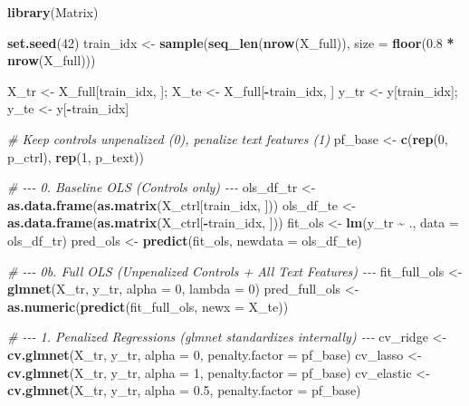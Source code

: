 \documentclass[
]{article}
\newenvironment{Shaded}{\begin{snugshade}}{\end{snugshade}}
\newcommand{\AttributeTok}[1]{\textcolor[rgb]{0.13,0.29,0.53}{#1}}
\newcommand{\CommentTok}[1]{\textcolor[rgb]{0.56,0.35,0.01}{\textit{#1}}}
\newcommand{\DecValTok}[1]{\textcolor[rgb]{0.00,0.00,0.81}{#1}}
\newcommand{\FloatTok}[1]{\textcolor[rgb]{0.00,0.00,0.81}{#1}}
\newcommand{\FunctionTok}[1]{\textcolor[rgb]{0.13,0.29,0.53}{\textbf{#1}}}
\newcommand{\NormalTok}[1]{#1}
\newcommand{\OtherTok}[1]{\textcolor[rgb]{0.56,0.35,0.01}{#1}}
\newcommand{\SpecialCharTok}[1]{\textcolor[rgb]{0.81,0.36,0.00}{\textbf{#1}}}
\begin{document}
\begin{Shaded}
\begin{Highlighting}[]
\FunctionTok{library}\NormalTok{(Matrix)}

\FunctionTok{set.seed}\NormalTok{(}\DecValTok{42}\NormalTok{)}
\NormalTok{train\_idx }\OtherTok{\textless{}{-}} \FunctionTok{sample}\NormalTok{(}\FunctionTok{seq\_len}\NormalTok{(}\FunctionTok{nrow}\NormalTok{(X\_full)), }\AttributeTok{size =} \FunctionTok{floor}\NormalTok{(}\FloatTok{0.8} \SpecialCharTok{*} \FunctionTok{nrow}\NormalTok{(X\_full)))}

\NormalTok{X\_tr }\OtherTok{\textless{}{-}}\NormalTok{ X\_full[train\_idx, ];  X\_te }\OtherTok{\textless{}{-}}\NormalTok{ X\_full[}\SpecialCharTok{{-}}\NormalTok{train\_idx, ]}
\NormalTok{y\_tr }\OtherTok{\textless{}{-}}\NormalTok{ y[train\_idx];         y\_te }\OtherTok{\textless{}{-}}\NormalTok{ y[}\SpecialCharTok{{-}}\NormalTok{train\_idx]}

\CommentTok{\# Keep controls unpenalized (0), penalize text features (1)}
\NormalTok{pf\_base }\OtherTok{\textless{}{-}} \FunctionTok{c}\NormalTok{(}\FunctionTok{rep}\NormalTok{(}\DecValTok{0}\NormalTok{, p\_ctrl), }\FunctionTok{rep}\NormalTok{(}\DecValTok{1}\NormalTok{, p\_text))}

\CommentTok{\# {-}{-}{-} 0. Baseline OLS (Controls only) {-}{-}{-}}
\NormalTok{ols\_df\_tr }\OtherTok{\textless{}{-}} \FunctionTok{as.data.frame}\NormalTok{(}\FunctionTok{as.matrix}\NormalTok{(X\_ctrl[train\_idx, ]))}
\NormalTok{ols\_df\_te }\OtherTok{\textless{}{-}} \FunctionTok{as.data.frame}\NormalTok{(}\FunctionTok{as.matrix}\NormalTok{(X\_ctrl[}\SpecialCharTok{{-}}\NormalTok{train\_idx, ]))}
\NormalTok{fit\_ols   }\OtherTok{\textless{}{-}} \FunctionTok{lm}\NormalTok{(y\_tr }\SpecialCharTok{\textasciitilde{}}\NormalTok{ ., }\AttributeTok{data =}\NormalTok{ ols\_df\_tr)}
\NormalTok{pred\_ols  }\OtherTok{\textless{}{-}} \FunctionTok{predict}\NormalTok{(fit\_ols, }\AttributeTok{newdata =}\NormalTok{ ols\_df\_te)}

\CommentTok{\# {-}{-}{-} 0b. Full OLS (Unpenalized Controls + All Text Features) {-}{-}{-}}
\NormalTok{fit\_full\_ols  }\OtherTok{\textless{}{-}} \FunctionTok{glmnet}\NormalTok{(X\_tr, y\_tr, }\AttributeTok{alpha =} \DecValTok{0}\NormalTok{, }\AttributeTok{lambda =} \DecValTok{0}\NormalTok{)}
\NormalTok{pred\_full\_ols }\OtherTok{\textless{}{-}} \FunctionTok{as.numeric}\NormalTok{(}\FunctionTok{predict}\NormalTok{(fit\_full\_ols, }\AttributeTok{newx =}\NormalTok{ X\_te))}

\CommentTok{\# {-}{-}{-} 1. Penalized Regressions (glmnet standardizes internally) {-}{-}{-}}
\NormalTok{cv\_ridge   }\OtherTok{\textless{}{-}} \FunctionTok{cv.glmnet}\NormalTok{(X\_tr, y\_tr, }\AttributeTok{alpha =} \DecValTok{0}\NormalTok{,   }\AttributeTok{penalty.factor =}\NormalTok{ pf\_base)}
\NormalTok{cv\_lasso   }\OtherTok{\textless{}{-}} \FunctionTok{cv.glmnet}\NormalTok{(X\_tr, y\_tr, }\AttributeTok{alpha =} \DecValTok{1}\NormalTok{,   }\AttributeTok{penalty.factor =}\NormalTok{ pf\_base)}
\NormalTok{cv\_elastic }\OtherTok{\textless{}{-}} \FunctionTok{cv.glmnet}\NormalTok{(X\_tr, y\_tr, }\AttributeTok{alpha =} \FloatTok{0.5}\NormalTok{, }\AttributeTok{penalty.factor =}\NormalTok{ pf\_base)}


\end{Highlighting}
\end{Shaded}
\end{document}
